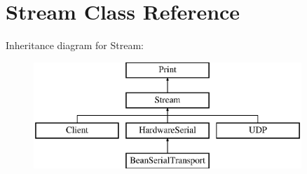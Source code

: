 \hypertarget{class_stream}{}\section{Stream Class Reference}
\label{class_stream}
Inheritance diagram for Stream\+:\begin{figure}[H]
\begin{center}
\leavevmode
\includegraphics[height=4.000000cm]{class_stream}
\end{center}
\end{figure}
